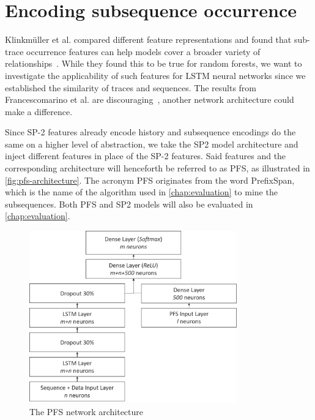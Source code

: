 \section{Encoding subsequence occurrence}
\label{sec:contrib:pfs-inspiration}
Klinkmüller et al. compared different feature representations and found that sub-trace occurrence features can help models cover a broader variety of relationships~\cite{klinkmuller2018reliablemonitoring}. While they found this to be true for random forests, we want to investigate the applicability of such features for LSTM neural networks since we established the similarity of traces and sequences. The results from Francescomarino et al. are discouraging~\cite{francescomarino2017}, another network architecture could make a difference.

Since SP-2 features already encode history and subsequence encodings do the same on a higher level of abstraction, we take the SP2 model architecture and inject different features in place of the SP-2 features. Said features and the corresponding architecture will henceforth be referred to as PFS, as illustrated in \autoref{fig:pfs-architecture}. The acronym PFS originates from the word PrefixSpan, which is the name of the algorithm used in \autoref{chap:evaluation} to mine the subsequences. Both PFS and SP2 models will also be evaluated in \autoref{chap:evaluation}.

\begin{figure}[ht]
    \centering
    \includegraphics[width=0.8\textwidth]{gfx/pfs-network-architecture.png}
    \caption{The PFS network architecture}
    \label{fig:pfs-architecture}
\end{figure}
